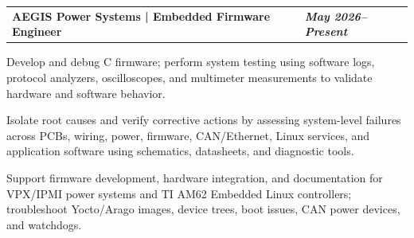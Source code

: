 \documentclass[10pt,letterpaper]{article}
\makeatletter
\newcommand{\resumeentry}[2]{%
  \begin{tabularx}{\textwidth}{@{}X>{\raggedleft\arraybackslash}p{2.40in}@{}}
    \textbf{#1} & \textbf{\textit{#2}}
  \end{tabularx}\vspace{-0.075cm}
}
\makeatother
\begin{document}
\resumeentry{AEGIS Power Systems | Embedded Firmware Engineer}{May 2026--Present}
\begin{resumebullets}
  \item Develop and debug C firmware; perform system testing using software logs, protocol analyzers, oscilloscopes, and multimeter measurements to validate hardware and software behavior.
  \item Isolate root causes and verify corrective actions by assessing system-level failures across PCBs, wiring, power, firmware, CAN/Ethernet, Linux services, and application software using schematics, datasheets, and diagnostic tools.
  \item Support firmware development, hardware integration, and documentation for VPX/IPMI power systems and TI AM62 Embedded Linux controllers; troubleshoot Yocto/Arago images, device trees, boot issues, CAN power devices, and watchdogs.
\end{resumebullets}
\end{document}
